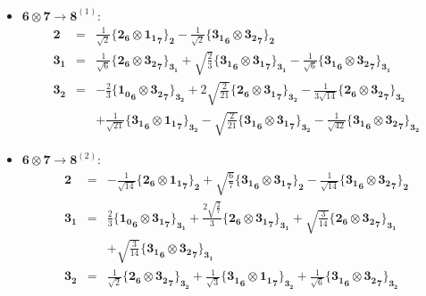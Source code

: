 \documentclass[english]{article}
\newcommand{\subcg}[3]{\big\{ {#1}\otimes{#2}\big\}^{}_{#3}}
\newcommand{\rep}[1]{\mathbf{#1}}
\begin{document}
\begin{itemize}
\begin{eqnarray*}
\end{eqnarray*}
\item $\rep{6}\otimes\rep{7}\to\rep{8}^{(1)}$:
\begin{eqnarray*}
\rep{2} &=& \frac{1}{\sqrt{2}}\subcg{\rep{2}_{\rep{6}}}{\rep{1_1}_{\rep{7}}}{\rep{2}}-\frac{1}{\sqrt{2}}\subcg{\rep{3_1}_{\rep{6}}}{\rep{3_2}_{\rep{7}}}{\rep{2}}
\\
\rep{3_1} &=& \frac{1}{\sqrt{6}}\subcg{\rep{2}_{\rep{6}}}{\rep{3_2}_{\rep{7}}}{\rep{3_1}}+\sqrt{\frac{2}{3}}\subcg{\rep{3_1}_{\rep{6}}}{\rep{3_1}_{\rep{7}}}{\rep{3_1}}-\frac{1}{\sqrt{6}}\subcg{\rep{3_1}_{\rep{6}}}{\rep{3_2}_{\rep{7}}}{\rep{3_1}}
\\
\rep{3_2} &=& -\frac{2}{3}\subcg{\rep{1_0}_{\rep{6}}}{\rep{3_2}_{\rep{7}}}{\rep{3_2}}+2 \sqrt{\frac{2}{21}}\subcg{\rep{2}_{\rep{6}}}{\rep{3_1}_{\rep{7}}}{\rep{3_2}}-\frac{1}{3 \sqrt{14}}\subcg{\rep{2}_{\rep{6}}}{\rep{3_2}_{\rep{7}}}{\rep{3_2}} \\ 
 & & +\frac{1}{\sqrt{21}}\subcg{\rep{3_1}_{\rep{6}}}{\rep{1_1}_{\rep{7}}}{\rep{3_2}}-\sqrt{\frac{2}{21}}\subcg{\rep{3_1}_{\rep{6}}}{\rep{3_1}_{\rep{7}}}{\rep{3_2}}-\frac{1}{\sqrt{42}}\subcg{\rep{3_1}_{\rep{6}}}{\rep{3_2}_{\rep{7}}}{\rep{3_2}}
\end{eqnarray*}
\item $\rep{6}\otimes\rep{7}\to\rep{8}^{(2)}$:
\begin{eqnarray*}
\rep{2} &=& -\frac{1}{\sqrt{14}}\subcg{\rep{2}_{\rep{6}}}{\rep{1_1}_{\rep{7}}}{\rep{2}}+\sqrt{\frac{6}{7}}\subcg{\rep{3_1}_{\rep{6}}}{\rep{3_1}_{\rep{7}}}{\rep{2}}-\frac{1}{\sqrt{14}}\subcg{\rep{3_1}_{\rep{6}}}{\rep{3_2}_{\rep{7}}}{\rep{2}}
\\
\rep{3_1} &=& \frac{2}{3}\subcg{\rep{1_0}_{\rep{6}}}{\rep{3_1}_{\rep{7}}}{\rep{3_1}}+\frac{2 \sqrt{\frac{2}{7}}}{3}\subcg{\rep{2}_{\rep{6}}}{\rep{3_1}_{\rep{7}}}{\rep{3_1}}+\sqrt{\frac{3}{14}}\subcg{\rep{2}_{\rep{6}}}{\rep{3_2}_{\rep{7}}}{\rep{3_1}} \\ 
 & & +\sqrt{\frac{3}{14}}\subcg{\rep{3_1}_{\rep{6}}}{\rep{3_2}_{\rep{7}}}{\rep{3_1}}
\\
\rep{3_2} &=& \frac{1}{\sqrt{2}}\subcg{\rep{2}_{\rep{6}}}{\rep{3_2}_{\rep{7}}}{\rep{3_2}}+\frac{1}{\sqrt{3}}\subcg{\rep{3_1}_{\rep{6}}}{\rep{1_1}_{\rep{7}}}{\rep{3_2}}+\frac{1}{\sqrt{6}}\subcg{\rep{3_1}_{\rep{6}}}{\rep{3_2}_{\rep{7}}}{\rep{3_2}}
\end{eqnarray*}
\end{itemize}
\end{document}
